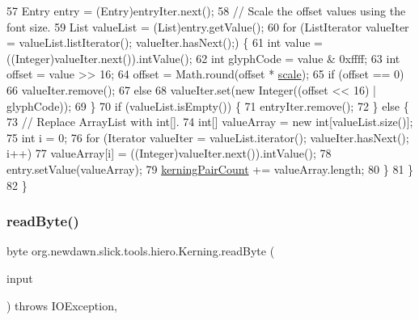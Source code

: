 \begin{DoxyCode}
57             Entry entry = (Entry)entryIter.next();
58             \textcolor{comment}{// Scale the offset values using the font size.}
59             List valueList = (List)entry.getValue();
60             \textcolor{keywordflow}{for} (ListIterator valueIter = valueList.listIterator(); valueIter.hasNext();) \{
61                 \textcolor{keywordtype}{int} value = ((Integer)valueIter.next()).intValue();
62                 \textcolor{keywordtype}{int} glyphCode = value & 0xffff;
63                 \textcolor{keywordtype}{int} offset = value >> 16;
64                 offset = Math.round(offset * \mbox{\hyperlink{classorg_1_1newdawn_1_1slick_1_1tools_1_1hiero_1_1_kerning_a3738309c9d9966c1fee3a5694404b87e}{scale}});
65                 \textcolor{keywordflow}{if} (offset == 0)
66                     valueIter.remove();
67                 \textcolor{keywordflow}{else}
68                     valueIter.set(\textcolor{keyword}{new} Integer((offset << 16) | glyphCode));
69             \}
70             \textcolor{keywordflow}{if} (valueList.isEmpty()) \{
71                 entryIter.remove();
72             \} \textcolor{keywordflow}{else} \{
73                 \textcolor{comment}{// Replace ArrayList with int[].}
74                 \textcolor{keywordtype}{int}[] valueArray = \textcolor{keyword}{new} \textcolor{keywordtype}{int}[valueList.size()];
75                 \textcolor{keywordtype}{int} i = 0;
76                 \textcolor{keywordflow}{for} (Iterator valueIter = valueList.iterator(); valueIter.hasNext(); i++)
77                     valueArray[i] = ((Integer)valueIter.next()).intValue();
78                 entry.setValue(valueArray);
79                 \mbox{\hyperlink{classorg_1_1newdawn_1_1slick_1_1tools_1_1hiero_1_1_kerning_a5d054877d909331426a9195b9ce1d133}{kerningPairCount}} += valueArray.length;
80             \}
81         \}
82     \}
\end{DoxyCode}
\mbox{\label{classorg_1_1newdawn_1_1slick_1_1tools_1_1hiero_1_1_kerning_a226c7723ee9c8d6269c67b8e6ac45d13}} 
\subsubsection{\texorpdfstring{read\+Byte()}{readByte()}}
{\footnotesize\ttfamily byte org.\+newdawn.\+slick.\+tools.\+hiero.\+Kerning.\+read\+Byte (\begin{DoxyParamCaption}\item[{Input\+Stream}]{input }\end{DoxyParamCaption}) throws I\+O\+Exception\hspace{0.3cm}{\ttfamily [inline]}, {\ttfamily [private]}}


